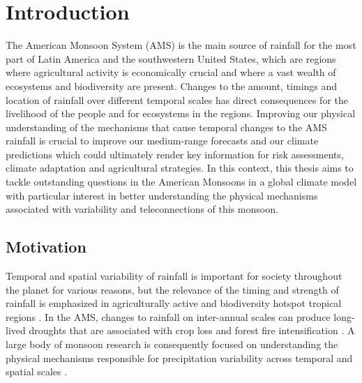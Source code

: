 

\chapter{\label{ch:1-intro}Introduction} 




The American Monsoon System (AMS) is the main source of rainfall for the most part of Latin America and the southwestern United States, which are regions where agricultural activity is economically crucial and where a vast wealth of ecosystems and biodiversity are present. Changes to the amount, timings and location of rainfall over different temporal scales has direct consequences for the livelihood of the people and for ecosystems in the regions. Improving our physical understanding of the mechanisms that cause temporal changes to the AMS rainfall is crucial to improve our medium-range forecasts and our climate predictions which could ultimately render key information for risk assessments, climate adaptation and agricultural strategies. In this context, this thesis aims to tackle outstanding questions in the American Monsoons in a global climate model with particular interest in better understanding the physical mechanisms associated with variability and teleconnections of this monsoon.



\section{Motivation}

Temporal and spatial variability of rainfall is important for society throughout the planet for various reasons, but the relevance of the timing and strength of rainfall is emphasized in agriculturally active and biodiversity hotspot tropical regions \citep{sultan2005,jain2015}. 
In the AMS, changes to rainfall on inter-annual scales can produce long-lived droughts that are associated with crop loss and forest fire intensification \citep{chen2009,harvey2018}.
A large body of monsoon research is consequently focused on understanding the physical mechanisms responsible for precipitation variability across temporal and spatial scales \citep{wang2017,gadgil2018}. 

